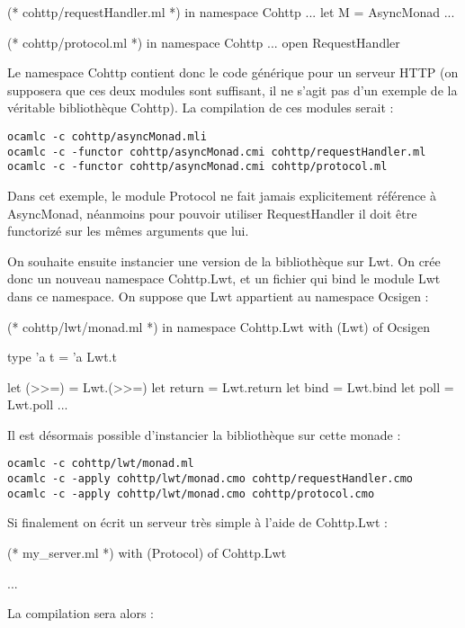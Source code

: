 \documentclass[11pt,a4paper]{report}
\begin{document}
\begin{OCaml}
(* cohttp/requestHandler.ml *)
in namespace Cohttp
...
let M = AsyncMonad
...
\end{OCaml}

\begin{OCaml}
(* cohttp/protocol.ml *)
in namespace Cohttp
...
open RequestHandler
\end{OCaml}

Le namespace Cohttp contient donc le code générique pour un serveur HTTP (on
supposera que ces deux modules sont suffisant, il ne s'agit pas d'un exemple de
la véritable bibliothèque Cohttp). La compilation de ces modules serait :
\begin{verbatim}
ocamlc -c cohttp/asyncMonad.mli
ocamlc -c -functor cohttp/asyncMonad.cmi cohttp/requestHandler.ml
ocamlc -c -functor cohttp/asyncMonad.cmi cohttp/protocol.ml
\end{verbatim}

Dans cet exemple, le module Protocol ne fait jamais explicitement référence à
AsyncMonad, néanmoins pour pouvoir utiliser RequestHandler il doit être
functorizé sur les mêmes arguments que lui.

On souhaite ensuite instancier une version de la bibliothèque sur Lwt. On crée
donc un nouveau namespace Cohttp.Lwt, et un fichier qui bind le module Lwt dans
ce namespace. On suppose que Lwt appartient au namespace Ocsigen :
\begin{OCaml}
(* cohttp/lwt/monad.ml *)
in namespace Cohttp.Lwt
with (Lwt) of Ocsigen

type 'a t = 'a Lwt.t

let (>>=) = Lwt.(>>=)
let return = Lwt.return
let bind = Lwt.bind
let poll = Lwt.poll
...
\end{OCaml} 

Il est désormais possible d'instancier la bibliothèque sur cette monade :

\begin{verbatim}
ocamlc -c cohttp/lwt/monad.ml
ocamlc -c -apply cohttp/lwt/monad.cmo cohttp/requestHandler.cmo
ocamlc -c -apply cohttp/lwt/monad.cmo cohttp/protocol.cmo
\end{verbatim}

Si finalement on écrit un serveur très simple à l'aide de Cohttp.Lwt :
\begin{OCaml}
(* my_server.ml *)
with (Protocol) of Cohttp.Lwt

...
\end{OCaml}

La compilation sera alors :
\end{document}
